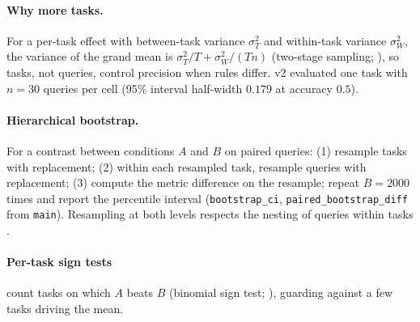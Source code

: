 \documentclass[11pt,a4paper]{article}
\newcommand{\1}{\mathbf{1}}
\theoremstyle{plain}
\theoremstyle{definition}
\theoremstyle{remark}
\begin{document}
\paragraph{Why more tasks.} For a per-task effect with between-task
variance $\sigma_T^2$ and within-task variance $\sigma_W^2$, the variance of
the grand mean is $\sigma_T^2/T + \sigma_W^2/(Tn)$ (two-stage sampling;
\citealp{cochran1977sampling}), so tasks, not queries, control precision
when rules differ. v2 evaluated one task with $n = 30$
queries per cell (95\% interval half-width $0.179$ at accuracy $0.5$).

\paragraph{Hierarchical bootstrap.} For a contrast between conditions $A$
and $B$ on paired queries: (1) resample tasks with replacement; (2) within
each resampled task, resample queries with replacement; (3) compute the
metric difference on the resample; repeat $B = 2000$ times and report the
percentile interval \citep{efron1993introduction}
(\texttt{bootstrap\_ci}, \texttt{paired\_bootstrap\_diff} from
\texttt{main}). Resampling at both levels respects the nesting of queries
within tasks \citep{davison1997bootstrap,saravanan2020application}.

\paragraph{Per-task sign tests} count tasks on which $A$ beats $B$ (binomial
sign test; \citealp{dixon1946statistical}), guarding against a few tasks
driving the mean.
\end{document}
